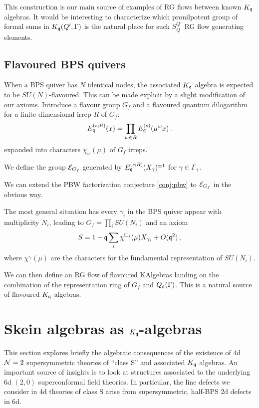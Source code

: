 \documentclass[12pt]{amsart}
\begin{document}
This construction is our main source of examples of RG flows between known $K_{\mathfrak{q}}$ algebras. It would be interesting to 
characterize which pronilpotent group of formal sums in $K_{\mathfrak{q}}(Q',\Gamma)$ is the natural place for such $S_Q^{Q'}$ RG flow generating elements.

\subsection{Flavoured BPS quivers}
When a BPS quiver has $N$ identical nodes, the associated $K_{\mathfrak{q}}$ algebra is expected to be $SU(N)$-flavoured. 
This can be made explicit by a slight modification of our axioms. 
Introduce a flavour group $G_f$ and a flavoured quantum dilogarithm for a finite-dimensional irrep $R$ of $G_f$:
\begin{equation}\label{eq:fleq}
  E^{(s;R)}_{\mathfrak{q}}(x)=\prod_{w \in R} E^{(s)}_{\mathfrak{q}}(\mu^w x) \,.
\end{equation}
expanded into characters $\chi_w(\mu)$ of $G_f$ irreps. 
\begin{definition}We define the group $\mathcal{E}_{G_f}$ generated by $E^{(s;R)}_{\mathfrak{q}}(X_\gamma)^{\pm 1}$ for $\gamma \in \Gamma_+$.  
\end{definition}
We can extend the PBW factorization conjecture \ref{conj:pbw} to $\mathcal{E}_{G_f}$ in the obvious way. 

The most general situation has every $\gamma_i$ in the BPS quiver appear with multiplicity $N_i$, leading to 
$G_f = \prod_i SU(N_i)$ and an axiom 
\begin{equation} \label{eq:flavouredquiver}
	S = 1 - \mathfrak{q} \sum_i \chi^{\square_i}(\mu) X_{\gamma_i} + O(\mathfrak{q}^2) \, ,
\end{equation}
where $\chi^{\square_i}(\mu)$ are the characters for the fundamental representation of $SU(N_i)$. 

We can then define an RG flow of flavoured KAlgebras landing on the combination of the representation ring of $G_f$ and 
$Q_{\mathfrak{q}}(\Gamma)$. This is a natural source of flavoured $K_{\mathfrak{q}}$-algebras. 

\section{Skein algebras as $K_{\mathfrak{q}}$-algebras}\label{sec:skein}
This section explores briefly the algebraic consequences of the existence of 4d ${\cal N}=2$ supersymmetric theories of ``class S'' \cite{Witten:1997sc,Gaiotto:2009we,Gaiotto:2009hg}
and associated $K_{\mathfrak{q}}$ algebras. An important source of insights is to look at structures associated to the underlying 6d $(2,0)$ superconformal field theories. In particular, the line defects we consider in 4d theories of class S arise from supersymmetric, half-BPS 2d defects in 6d.
\end{document}
